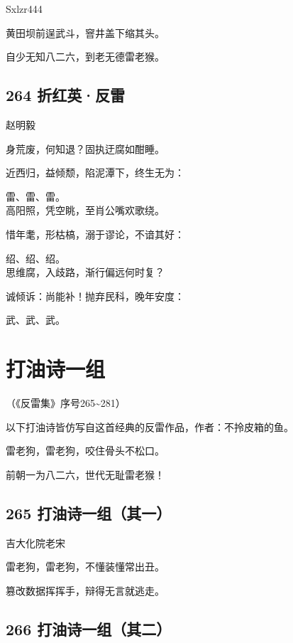 {Sxlzr444}

黄田坝前逞武斗，窨井盖下缩其头。

自少无知八二六，到老无德雷老猴。

\hypertarget{ux6298ux7ea2ux82f1ux53cdux96f7}{%
\subsection{264 折红英·反雷}\label{ux6298ux7ea2ux82f1ux53cdux96f7}}

{赵明毅}

身荒废，何知退？固执迂腐如酣睡。

近西归，益倾颓，陷泥潭下，终生无为：

雷、雷、雷。 ~\\
高阳照，凭空眺，至肖公嘴欢歌绕。

惜年耄，形枯槁，溺于谬论，不谙其好：

绍、绍、绍。 ~\\
思维腐，入歧路，渐行偏远何时复？

诚倾诉：尚能补！抛弃民科，晚年安度：

武、武、武。

\hypertarget{ux6253ux6cb9ux8bd7ux4e00ux7ec4}{%
\section{打油诗一组}\label{ux6253ux6cb9ux8bd7ux4e00ux7ec4}}

（《反雷集》序号265\textasciitilde281）

以下打油诗皆仿写自这首经典的反雷作品，作者：不拎皮箱的鱼。

雷老狗，雷老狗，咬住骨头不松口。

前朝一为八二六，世代无耻雷老猴！

\hypertarget{ux6253ux6cb9ux8bd7ux4e00ux7ec4ux5176ux4e00}{%
\subsection{265
打油诗一组（其一）}\label{ux6253ux6cb9ux8bd7ux4e00ux7ec4ux5176ux4e00}}

{吉大化院老宋}

雷老狗，雷老狗，不懂装懂常出丑。

篡改数据挥挥手，辩得无言就逃走。

\hypertarget{ux6253ux6cb9ux8bd7ux4e00ux7ec4ux5176ux4e8c}{%
\subsection{266
打油诗一组（其二）}\label{ux6253ux6cb9ux8bd7ux4e00ux7ec4ux5176ux4e8c}}

